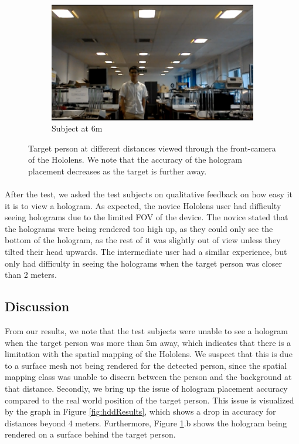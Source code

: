\begin{figure}[ht]
	\begin{subfigure}[b]{.32\textwidth}
		\centering
		\includegraphics[width=1.0\linewidth]{img/chapter6_test/marek2.png}
		\caption{Subject at 6m}
	\end{subfigure}
	\vspace{-1\baselineskip}
	\begin{center}
		\caption{Target person at different distances viewed through the front-camera of the Hololens. We note that the accuracy of the hologram placement decreases as the target is further away.}
		\label{fig:marek}
	\end{center}
	\vspace{-2\baselineskip}
\end{figure}

\paragraph{} After the test, we asked the test subjects on qualitative feedback on how easy it it is to view a hologram. As expected, the novice Hololens user had difficulty seeing holograms due to the limited FOV of the device. The novice stated that the holograms were being rendered too high up, as they could only see the bottom of the hologram, as the rest of it was slightly out of view unless they tilted their head upwards. The intermediate user had a similar experience, but only had difficulty in seeing the holograms when the target person was closer than 2 meters.

\subsection{Discussion} \label{sec:distanceDiscussion}
From our results, we note that the test subjects were unable to see a hologram when the target person was more than 5m away, which indicates that there is a limitation with the spatial mapping of the Hololens. We suspect that this is due to a surface mesh not being rendered for the detected person, since the spatial mapping class was unable to discern between the person and the background at that distance. Secondly, we bring up the issue of hologram placement accuracy compared to the real world position of the target person. This issue is visualized by the graph in Figure \ref{fig:hddResults}, which shows a drop in accuracy for distances beyond 4 meters. Furthermore, Figure \ref{fig:marek}.b shows the hologram being rendered on a surface behind the target person.

